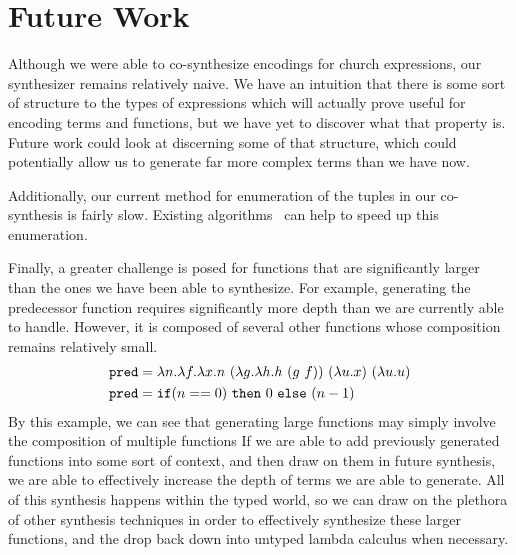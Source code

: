 \section{Future Work}
Although we were able to co-synthesize encodings for church expressions,
  our synthesizer remains relatively naive.
We have an intuition that there is some sort of structure to the types
  of expressions which will actually prove useful for encoding terms
  and functions, but we have yet to discover what that property is.
Future work could look at discerning some of that structure, which could
  potentially allow us to generate far more complex terms than we have now.

Additionally, our current method for enumeration of the tuples in our
  co-synthesis is fairly slow.
Existing algorithms~\cite{monad-transformers} can help to speed up this
  enumeration.

Finally, a greater challenge is posed for functions that are
  significantly larger than the ones we have been able to synthesize.
For example, generating the predecessor function requires significantly
  more depth than we are currently able to handle.
However, it is composed of several other functions whose composition remains
  relatively small.
%
\begin{align*}
  \texttt{pred} &= \lambda n.\lambda f.\lambda x.n\
              (\lambda g.\lambda h.h\ (g\ f))\ (\lambda u.x)\ (\lambda u.u) \\
  \texttt{pred} &= \texttt{if} (n==0)\ \texttt{then}\ 0\ \texttt{else}\ (n-1)
\end{align*}
%
By this example, we can see that generating large functions may simply
  involve the composition of multiple functions
If we are able to add previously generated functions into some sort of
  context, and then draw on them in future synthesis, we are able to
  effectively increase the depth of terms we are able to generate.
All of this synthesis happens within the typed world, so we can draw
  on the plethora of other synthesis techniques in order to effectively
  synthesize these larger functions, and the drop back down into untyped
  lambda calculus when necessary.
